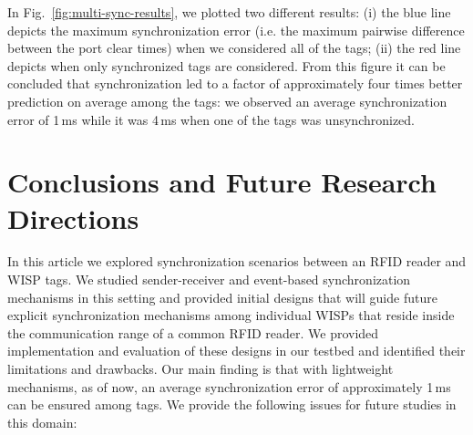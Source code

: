 \documentclass[10pt,journal,compsoc]{IEEEtran}
\begin{document}
In Fig.~\ref{fig:multi-sync-results}, we plotted two different results: (i) the blue line depicts the maximum synchronization error (i.e. the maximum pairwise difference between the port clear times) when we considered all of the tags; (ii) the red line depicts when only synchronized tags are considered. From this figure it can be concluded that synchronization led to a factor of approximately four times better prediction on average among the tags: we observed an average synchronization error of 1\,ms while it was 4\,ms when one of the tags was unsynchronized.  

\section{Conclusions and Future Research Directions}
\label{sec:Conclusion}

In this article we explored synchronization scenarios between an RFID reader and WISP tags. We studied sender-receiver and event-based synchronization mechanisms in this setting and provided initial designs that will guide future explicit synchronization mechanisms among individual WISPs that reside inside the communication range of a common RFID reader. We provided implementation and evaluation of these designs in our testbed and identified their limitations and drawbacks. Our main finding is that with lightweight mechanisms, as of now, an average synchronization error of approximately 1\,ms can be ensured among tags. We provide the following issues for future studies in this domain:
\end{document}
